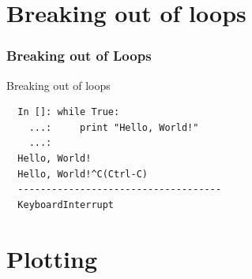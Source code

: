 \documentclass[14pt,compress]{beamer}
\newcounter{time}
\newcommand{\inctime}[1]{\addtocounter{time}{#1}{\tiny \thetime\ m}}
\begin{document}

\section{Breaking out of loops}
\begin{frame}[fragile]
\frametitle{Breaking out of Loops}
Breaking out of loops
\begin{lstlisting}     
  In []: while True:
    ...:     print "Hello, World!"
    ...:     
  Hello, World!
  Hello, World!^C(Ctrl-C)
  ------------------------------------
  KeyboardInterrupt                   
\end{lstlisting}
  \inctime{10}
\end{frame}

\section{Plotting}
\end{document}

